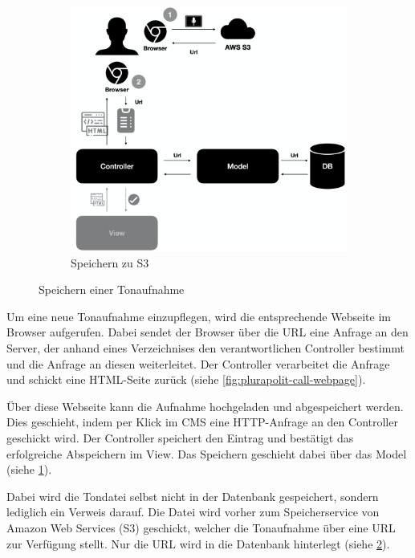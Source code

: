 \begin{figure}
\begin{subfigure}[a]{0.4\linewidth}
		\label{fig:plurapolit-save-sounddatei}
	\end{subfigure}
	\begin{subfigure}[b]{0.4\linewidth}
		\includegraphics[width=\linewidth]{Assets/PluraPolit-Softwaresystem.003}
		\caption{Speichern zu S3}
		\label{fig:plurapolit-save-to-s3}
	\end{subfigure}
	\caption{Speichern einer Tonaufnahme}
	\label{fig:coffee}
\end{figure}

Um eine neue Tonaufnahme einzupflegen, wird die entsprechende Webseite im Browser aufgerufen. Dabei sendet der Browser über die URL eine Anfrage an den Server, der anhand eines Verzeichnises den verantwortlichen Controller bestimmt und die Anfrage an diesen weiterleitet.  Der Controller verarbeitet die Anfrage und schickt eine HTML-Seite zurück (siehe \cref{fig:plurapolit-call-webpage}).

Über diese Webseite kann die Aufnahme hochgeladen und abgespeichert werden. 
Dies geschieht, indem per Klick im CMS eine HTTP-Anfrage an den Controller geschickt wird. Der Controller speichert den Eintrag und bestätigt das erfolgreiche Abspeichern im View. Das Speichern geschieht dabei über das Model (siehe \cref{fig:plurapolit-save-sounddatei}).

Dabei wird die Tondatei selbst nicht in der Datenbank gespeichert, sondern lediglich ein Verweis darauf. 
Die Datei wird vorher zum Speicherservice von Amazon Web Services (S3) geschickt, welcher die Tonaufnahme über eine URL zur Verfügung stellt. Nur die URL wird in die Datenbank hinterlegt (siehe \cref{fig:plurapolit-save-to-s3}).

